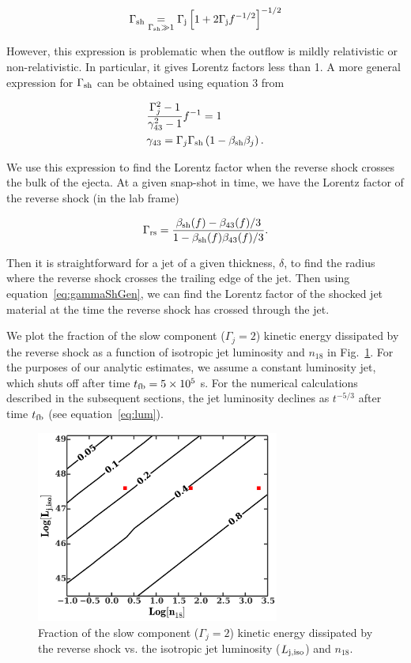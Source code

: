 \documentclass[usenatbib,fleqn]{mnras}
\begin{document}
\begin{equation}
\Gamma_{\rm sh} \underset{\Gamma_{\rm sh} \gg 1}= \Gamma_{\rm j}\left[1 + 2\Gamma_{\rm j}f^{-1/2}\right]^{-1/2}
\end{equation}

However, this expression is problematic when the outflow is mildly
relativistic or non-relativistic. In particular, it gives Lorentz
factors less than 1. A more general expression for $\Gamma_{\rm sh}$
can be obtained using equation 3 from \citet{Beloborodov&Uhm2006}

\begin{align}
&\frac{\Gamma_j^2-1}{\gamma_{43}^2-1} f^{-1}=1\\
&\gamma_{43}=\Gamma_j \Gamma_{\rm sh} \left(1-\beta_{\rm sh} \beta_j\right).
\label{eq:gammaShGen}
\end{align}

We use this expression to find the Lorentz factor when the reverse
shock crosses the bulk of the ejecta.  At a given snap-shot in time,
we have the Lorentz factor of the reverse shock (in the lab frame)

\begin{equation}
\Gamma_{\rm rs}=\frac{\beta_{\rm sh}(f)-\beta_{43}(f)/3}{1-\beta_{\rm
    sh}(f) \beta_{43}(f)/3}.
\end{equation} 

Then it is straightforward for a jet of a given thickness, $\delta$,
to find the radius where the reverse shock crosses the trailing edge
of the jet. Then using equation~\eqref{eq:gammaShGen}, we can find the
Lorentz factor of the shocked jet material at the time the reverse
shock has crossed through the jet.  

We plot the fraction of the slow component ($\Gamma_j=2$) kinetic
energy dissipated by the reverse shock as a function of isotropic jet
luminosity and $n_{18}$ in Fig.~\ref{fig:diss}. For the purposes of
our analytic estimates, we assume a constant luminosity jet, which
shuts off after time $t_{\rm fb}=5 \times 10^{5}$ s. For the numerical
calculations described in the subsequent sections, the jet luminosity
declines as $t^{-5/3}$ after time $t_{\rm fb}$ (see equation~\eqref{eq:lum}).


\begin{figure}
\includegraphics[width=8cm]{diss.pdf}
\caption{\label{fig:diss} Fraction of the slow component
  ($\Gamma_j=2$) kinetic energy dissipated by the reverse shock
  vs. the isotropic jet luminosity ($L_{\rm j,iso}$) and $n_{18}$.}
\end{figure}
\end{document}
